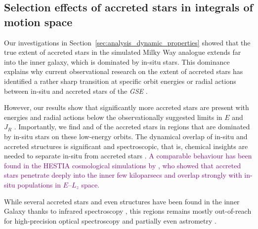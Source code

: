 \documentclass[fleqn,usenatbib]{mnras}
\newcommand{\changed}[1]{{\textcolor{purple}{#1}}}
\begin{document}
\subsection{Selection effects of accreted stars in integrals of motion space} \label{sec:discussion_finding_accreted_stars}

Our investigations in Section~\ref{sec:analysis_dynamic_properties} showed that the true extent of accreted stars in the simulated Milky Way analogue extends far into the inner galaxy, which is dominated by in-situ stars. This dominance explains why current observational research on the extent of accreted stars has identified a rather sharp transition at specific orbit energies or radial actions between in-situ and accreted stars of the \textit{GSE} \citep{Helmi2018, Feuillet2021, Monty2024}.

However, our results show that significantly more accreted stars are present with energies and radial actions below the observationally suggested limits in $E$ \citep{Helmi2018, Monty2024} and $J_R$ \citep{Feuillet2020, Feuillet2021}. Importantly, we find  and  of the accreted stars in regions that are dominated by in-situ stars on these low-energy orbits. The dynamical overlap of in-situ and accreted structures is significant and spectroscopic, that is, chemical insights are needed to separate in-situ from accreted stars \citep[for example][]{Das2020, Horta2021, Sestito2021, Buder2022}. \changed{A comparable behaviour has been found in the HESTIA cosmological simulations by \citet{Khoperskov2023b}, who showed that accreted stars penetrate deeply into the inner few kiloparsecs and overlap strongly with in-situ populations in $E$–$L_z$ space.}

While several accreted stars and even structures have been found in the inner Galaxy thanks to infrared spectroscopy \citep[for example][]{Horta2021}, this regions remains mostly out-of-reach for high-precision optical spectroscopy and partially even astrometry \citep{Queiroz2023}.
\end{document}

